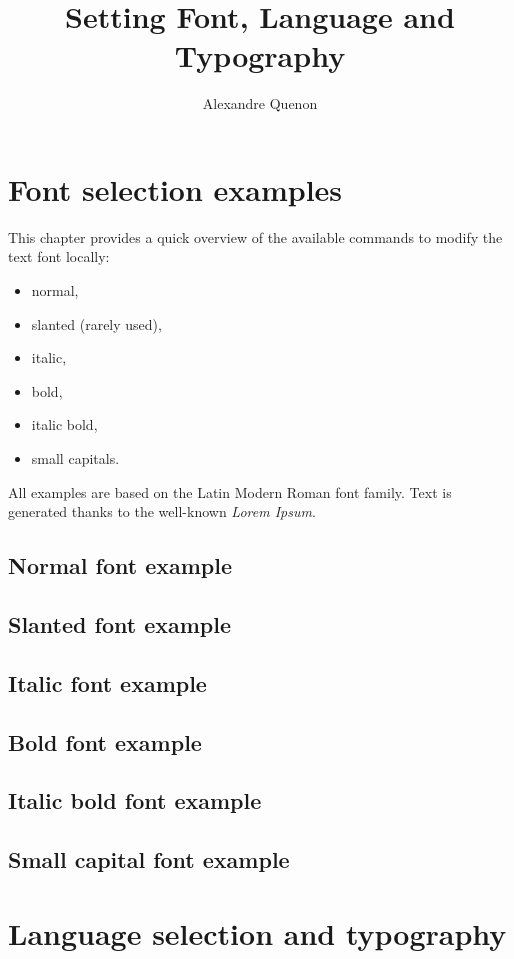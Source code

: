 \documentclass[11pt, a4paper]{report}
\title{Setting Font, Language and Typography}
\author{Alexandre Quenon}
\begin{document}

\maketitle

\tableofcontents


\chapter{Font selection examples}
	
	This chapter provides a quick overview of the available commands to modify the text font locally:
	\begin{itemize}
		\item normal,
		\item slanted (rarely used),
		\item italic,
		\item bold,
		\item italic bold,
		\item small capitals.
	\end{itemize}
	
	All examples are based on the Latin Modern Roman font family.
	Text is generated thanks to the well-known \textit{Lorem Ipsum}.
	
	
	\section{Normal font example}
	
	\lipsum[1]
	
	
	\section{Slanted font example}
	
	\textsl{\lipsum[1]}
	
	
	\section{Italic font example}
	
	\textit{\lipsum[1]}
	
	
	\section{Bold font example}
	
	\textbf{\lipsum[1]}
	
	
	\section{Italic bold font example}
	
	\textbf{\textit{\lipsum[1]}}
	
	
	\section{Small capital font example}
	
	\textsc{\lipsum[1]}
	

\chapter{Language selection and typography}

	
\end{document}
